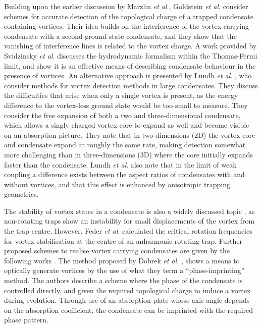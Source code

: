 Building upon the earlier discussion by Marzlin \textit{et al}., Goldstein \textit{et al}. \cite{Vtx:Goldstein_pra_1998} consider schemes for accurate detection of the topological charge of a trapped condensate containing vortices. Their idea builds on the interference of the vortex carrying condensate with a second ground-state condensate, and they show that the vanishing of interference lines is related to the vortex charge. A work provided by Svidzinsky \textit{et al}. \cite{Vtx:Svidzinsky_pra_1998} discusses the hydrodynamic formalism within the Thomas-Fermi limit, and show it is an effective means of describing condensate behaviour in the presence of vortices. An alternative approach is presented by Lundh \textit{et al}. \cite{Vtx:Lundh_pra_1998}, who consider methods for vortex detection methods in large condensates. They discuss the difficulties that arise when only a single vortex is present, as the energy difference to the vortex-less ground state would be too small to measure. They consider the free expansion of both a two and three-dimensional condensate, which allows a singly charged vortex core to expand as well and become visible on an absorption picture. They note that in two-dimensions (2D) the vortex core and condensate expand at roughly the same rate, making detection somewhat more challenging than in three-dimensions (3D) where the core initially expands faster than the condensate. Lundh \textit{et al}. also note that in the limit of weak coupling a difference exists between the aspect ratios of condensates with and without vortices, and that this effect is enhanced by anisotropic trapping geometries.

The stability of vortex states in a condensate is also a widely discussed topic \cite{Vtx:Fedichev_pra_1999,Vtx:Feder_prl_1999}, as non-rotating traps show an instability for small displacements of the vortex from the trap centre. However, Feder \textit{et al}. \cite{Vtx:Feder_prl_1999} calculated the critical rotation frequencies for vortex stabilisation at the centre of an anharmonic rotating trap. Further proposed schemes to realise vortex carrying condensates are given by the following works \cite{Vtx:Anglin_prl_1999,Vtx:Davies_prl_1999,Vtx:Marshall_pra_1999,Vtx:Dobrek_pra_1999}. The method proposed by Dobrek \textit{et al}. \cite{Vtx:Dobrek_pra_1999}, shows a means to optically generate vortices by the use of what they term a ``phase-imprinting'' method. The authors describe a scheme where
the phase of the condensate is controlled directly, and given the required topological charge to induce a vortex during evolution. Through use of an absorption plate whose axis angle depends on the absorption coefficient, the condensate can be imprinted with the required phase pattern.

